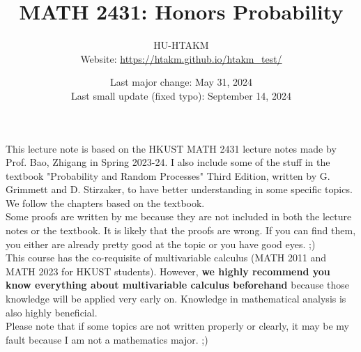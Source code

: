 \documentclass{huhtakm-template-book}
\title{MATH 2431: Honors Probability}
\author{
	HU-HTAKM\\
	Website: \url{https://htakm.github.io/htakm_test/}
}
\date{
	Last major change: May 31, 2024\\
	Last small update (fixed typo): September 14, 2024
}
\begin{document}
\maketitle
This lecture note is based on the HKUST MATH 2431 lecture notes made by Prof. Bao, Zhigang in Spring 2023-24. I also include some of the stuff in the textbook "Probability and Random Processes" Third Edition, written by G. Grimmett and D. Stirzaker, to have better understanding in some specific topics. We follow the chapters based on the textbook.\\
Some proofs are written by me because they are not included in both the lecture notes or the textbook. It is likely that the proofs are wrong. If you can find them, you either are already pretty good at the topic or you have good eyes. ;)\\
This course has the co-requisite of multivariable calculus (MATH 2011 and MATH 2023 for HKUST students). However, \textbf{we highly recommend you know everything about multivariable calculus beforehand} because those knowledge will be applied very early on. Knowledge in mathematical analysis is also highly beneficial.\\
Please note that if some topics are not written properly or clearly, it may be my fault because I am not a mathematics major. ;)
\end{document}
